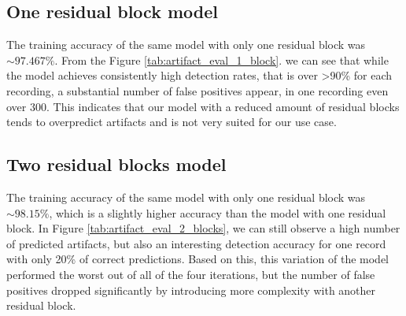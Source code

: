 \documentclass[12pt,a4paper,titlepage,openany]{report}
\begin{document}
\subsection{One residual block model}

The training accuracy of the same model with only one residual block was \(\sim97.467\%\).
From the Figure \ref{tab:artifact_eval_1_block}. we can see that while the model achieves consistently high detection rates, that is over \textgreater90\% for each recording, a substantial number of false positives appear, in one recording even over 300. This indicates that our model with a reduced amount of residual blocks tends to overpredict artifacts and is not very suited for our use case.

\begin{table}[htbp]
\centering
{}
\caption{Artifact-level evaluation of model predictions with one residual block}
\label{tab:artifact_eval_1_block}
\end{table}


\subsection{Two residual blocks model}

The training accuracy of the same model with only one residual block was \(\sim98.15\%\), which is a slightly higher accuracy than the model with one residual block.
In Figure \ref{tab:artifact_eval_2_blocks}, we can still observe a high number of predicted artifacts, but also an interesting detection accuracy for one record with only 20\% of correct predictions. Based on this, this variation of the model performed the worst out of all of the four iterations, but the number of false positives dropped significantly by introducing more complexity with another residual block.
\end{document}
